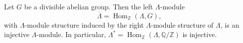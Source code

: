 Let $G$ be a divisible abelian group. Then the left $\Lambda$-module
$$\overline{\Lambda} = \operatorname{Hom}_{\mathbb{Z}}(\Lambda, G),$$
with $\Lambda$-module structure induced by the right $\Lambda$-module structure of $\Lambda$, is an injective $\Lambda$-module. In particular, $\Lambda^{*} = \operatorname{Hom}_{\mathbb{Z}}(\Lambda, \mathbb{Q}/\mathbb{Z})$ is injective.
